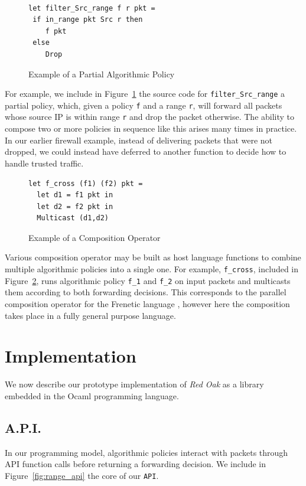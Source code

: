 \documentclass[nocopyrightspace]{sigplanconf}
\begin{document}
\begin{figure}[ht]
\begin{lstlisting}

let filter_Src_range f r pkt =
 if in_range pkt Src r then
    f pkt
 else
    Drop   
\end{lstlisting}

\caption{Example of a Partial Algorithmic Policy}
\label{fig:ex-hole}
\end{figure}

   
   For example, we include in Figure~\ref{fig:ex-hole} the source code for \lstinline|filter_Src_range| a partial policy, which, given a policy \lstinline|f| and a range \lstinline|r|, will forward all packets whose source IP is within range \lstinline|r| and drop the packet otherwise. The ability to compose two or more policies in sequence like this arises many times in practice. In our earlier firewall example, instead of delivering packets that were not dropped, we could instead have deferred to another function to decide how to handle trusted traffic.


   \begin{figure}[ht]
\begin{lstlisting}
let f_cross (f1) (f2) pkt =
  let d1 = f1 pkt in
  let d2 = f2 pkt in
  Multicast (d1,d2)
\end{lstlisting}

\caption{Example of a Composition Operator}
\label{fig:ex-cross}
\end{figure}
   
Various composition operator may be built as host language functions to combine multiple algorithmic policies into a single one. For example, \lstinline|f_cross|, included in Figure~\ref{fig:ex-cross}, runs algorithmic policy \lstinline|f_1| and \lstinline|f_2| on input packets and multicasts them according to both forwarding decisions. This corresponds to the parallel composition operator for the Frenetic language \cite{Frenetic}, however here the composition takes place in a fully general purpose language.
   
\section*{Implementation}

We now describe our prototype implementation of \textit{Red Oak} as a library embedded in the Ocaml programming language.

\subsection*{A.P.I.}
In our programming model, algorithmic policies interact with packets through API function calls before returning a forwarding decision. We include in Figure~\ref{fig:range_api} the core of our \lstinline|API|.
\end{document}
